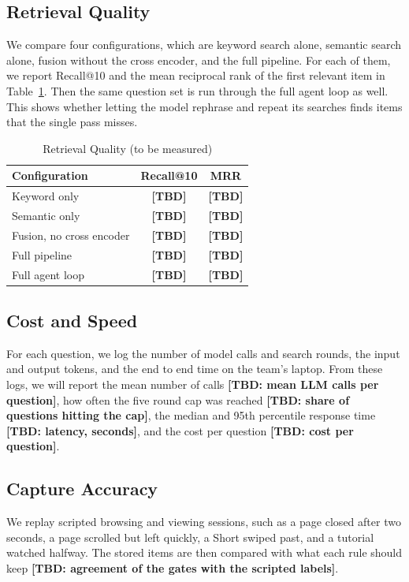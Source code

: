 \documentclass[conference]{IEEEtran}
\newcommand{\tbd}[1]{\textbf{[TBD: #1]}}
\begin{document}
\subsection{Retrieval Quality}
We compare four configurations, which are keyword search alone, semantic search alone, fusion without the cross encoder, and the full pipeline. For each of them, we report Recall@10 and the mean reciprocal rank of the first relevant item in Table~\ref{tab:results}. Then the same question set is run through the full agent loop as well. This shows whether letting the model rephrase and repeat its searches finds items that the single pass misses.

\begin{table}[t]
\caption{Retrieval Quality (to be measured)}
\label{tab:results}
\centering
\renewcommand{\arraystretch}{1.15}
\begin{tabular}{|l|c|c|}
\hline
\textbf{Configuration} & \textbf{Recall@10} & \textbf{MRR} \\
\hline
Keyword only & \textbf{[TBD]} & \textbf{[TBD]} \\
\hline
Semantic only & \textbf{[TBD]} & \textbf{[TBD]} \\
\hline
Fusion, no cross encoder & \textbf{[TBD]} & \textbf{[TBD]} \\
\hline
Full pipeline & \textbf{[TBD]} & \textbf{[TBD]} \\
\hline
Full agent loop & \textbf{[TBD]} & \textbf{[TBD]} \\
\hline
\end{tabular}
\end{table}

\subsection{Cost and Speed}
For each question, we log the number of model calls and search rounds, the input and output tokens, and the end to end time on the team's laptop. From these logs, we will report the mean number of calls \tbd{mean LLM calls per question}, how often the five round cap was reached \tbd{share of questions hitting the cap}, the median and 95th percentile response time \tbd{latency, seconds}, and the cost per question \tbd{cost per question}.

\subsection{Capture Accuracy}
We replay scripted browsing and viewing sessions, such as a page closed after two seconds, a page scrolled but left quickly, a Short swiped past, and a tutorial watched halfway. The stored items are then compared with what each rule should keep \tbd{agreement of the gates with the scripted labels}.
\end{document}
